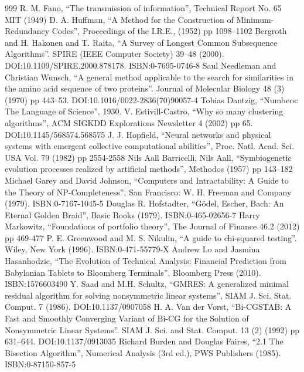 \documentclass[justified, sixbynine]{tufte-book}
\theoremstyle{plain}%
\newtheorem * {corollary}{Corollary}
\theoremstyle{definition}
\theoremstyle{remark}
\newtheorem * {remark}{Remark}
\newtheorem * {note}{Note}
\begin{document}
\begin{thebibliography}{999}
 R. M. Fano, ``The transmission of information'', Technical Report No. 65 MIT (1949)
 D. A. Huffman, ``A Method for the Construction of Minimum-Redundancy Codes'', Proceedings of the I.R.E., (1952) pp 1098–1102
 Bergroth and H. Hakonen and T. Raita, ``A Survey of Longest Common Subsequence Algorithms''. SPIRE (IEEE Computer Society) 39–48 (2000). DOI:10.1109/SPIRE.2000.878178. ISBN:0-7695-0746-8
 Saul Needleman and Christian Wunsch, ``A general method applicable to the search for similarities in the amino acid sequence of two proteins''. Journal of Molecular Biology 48 (3) (1970) pp 443–53. DOI:10.1016/0022-2836(70)90057-4
 Tobias Dantzig, ``Numbers: The Language of Science'', 1930.
 V. Estivill-Castro, ``Why so many clustering algorithms'', ACM SIGKDD Explorations Newsletter 4 (2002) pp 65. DOI:10.1145/568574.568575
 J. J. Hopfield, ``Neural networks and physical systems with emergent collective computational abilities'', Proc. Natl. Acad. Sci. USA Vol. 79 (1982) pp 2554-2558
 Nils Aall Barricelli, Nils Aall, ``Symbiogenetic evolution processes realized by artificial methods'', Methodos (1957) pp 143–182
 Michael Garey and David Johnson, ``Computers and Intractability: A Guide to the Theory of NP-Completeness'', San Francisco: W. H. Freeman and Company (1979). ISBN:0-7167-1045-5
 Douglas R. Hofstadter, ``Gödel, Escher, Bach: An Eternal Golden Braid'', Basic Books (1979). ISBN:0-465-02656-7
 Harry Markowitz, ``Foundations of portfolio theory'', The Journal of Finance 46.2 (2012) pp 469-477
 P. E. Greenwood and M. S. Nikulin, ``A guide to chi-squared testing''. Wiley, New York (1996). ISBN:0-471-55779-X
 Andrew Lo and Jasmina Hasanhodzic, ``The Evolution of Technical Analysis: Financial Prediction from Babylonian Tablets to Bloomberg Terminals'', Bloomberg Press (2010). ISBN:1576603490
 Y. Saad and M.H. Schultz, ``GMRES: A generalized minimal residual algorithm for solving nonsymmetric linear systems'', SIAM J. Sci. Stat. Comput. 7 (1986). DOI:10.1137/0907058
 H. A. Van der Vorst, ``Bi-CGSTAB: A Fast and Smoothly Converging Variant of Bi-CG for the Solution of Nonsymmetric Linear Systems''. SIAM J. Sci. and Stat. Comput. 13 (2) (1992) pp 631–644. DOI:10.1137/0913035
 Richard Burden and Douglas Faires, ``2.1 The Bisection Algorithm'', Numerical Analysis (3rd ed.), PWS Publishers (1985). ISBN:0-87150-857-5

\end{thebibliography}
\end{document}
